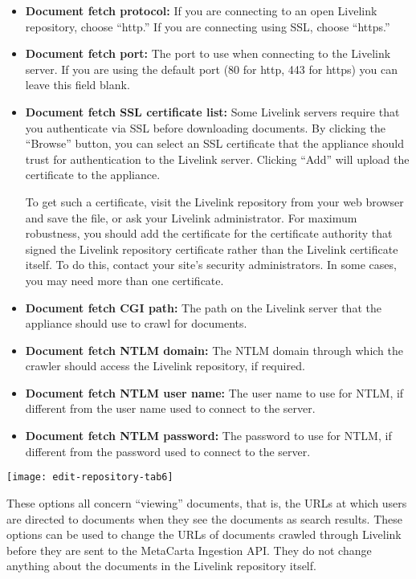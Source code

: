 \begin{itemize}

\item \textbf{Document fetch protocol:} If you are connecting to an
open Livelink repository, choose ``http.'' If you are connecting using
SSL, choose ``https.''

\item \textbf{Document fetch port:} The port to use when connecting
to the Livelink server. If you are using the default port (80 for
http, 443 for https) you can leave this field blank. 

\item \textbf{Document fetch SSL certificate list:} Some Livelink servers
require that you authenticate via SSL before downloading documents. By
clicking the ``Browse'' button, you can select an SSL certificate that
the appliance should trust for authentication to the Livelink server. Clicking
``Add'' will upload the certificate to the appliance.

To get such a certificate, visit the Livelink repository from your
web browser and save the file, or ask your Livelink administrator.
For maximum robustness, you should add the certificate for the certificate
authority that signed the Livelink repository certificate rather than
the Livelink certificate itself. To do this, contact your site's security
administrators. In some cases, you may need more than one certificate.

\item \textbf{Document fetch CGI path:} The path on the Livelink server that the
appliance should use to crawl for documents.

\item \textbf{Document fetch NTLM domain:} The NTLM domain 
through which the crawler should access the Livelink repository, if required.

\item \textbf{Document fetch NTLM user name:} The user name to use for 
NTLM, if different from the user name used to connect to the server.

\item \textbf{Document fetch NTLM password:} The password to use for
NTLM, if different from the password used to connect to the server.

\end{itemize}

\texttt{[image: edit-repository-tab6]}

These options all concern ``viewing'' documents, that is, the URLs
at which users are directed to documents when they see the documents
as search results. These options can be used to change the URLs of
documents crawled through Livelink before they are sent to the MetaCarta
Ingestion API. They do not change anything about the documents in the
Livelink repository itself. 

